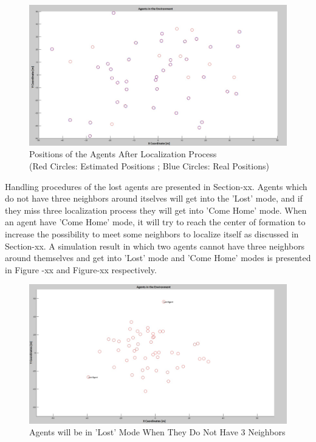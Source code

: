 			\begin{figure}[H]
				\caption{Positions of the Agents After Localization Process \\
					(Red Circles: Estimated Positions ; Blue Circles: Real Positions)}
				\centerline{\includegraphics[scale = 0.30]{Pozisyon-1-Duzeltilmis}}
			\end{figure} 
		
		Handling procedures of the lost agents are presented in Section-xx. Agents which do not have three neighbors around itselves will get into the 'Lost' mode, and if  they miss three localization process they will get into 'Come Home' mode. When an agent have 'Come Home' mode, it will try to reach the center of formation to increase the possibility to meet some neighbors to localize itself as discussed in Section-xx. A simulation result in which two agents cannot have three neighbors around themselves and get into 'Lost' mode and 'Come Home' modes  is presented in Figure -xx and Figure-xx respectively.
		
			\begin{figure}[H]
				\caption{Agents will be in 'Lost' Mode When They Do Not Have 3 Neighbors}
				\centerline{\includegraphics[scale = 0.30]{Lost-2-2}}
			\end{figure} 

